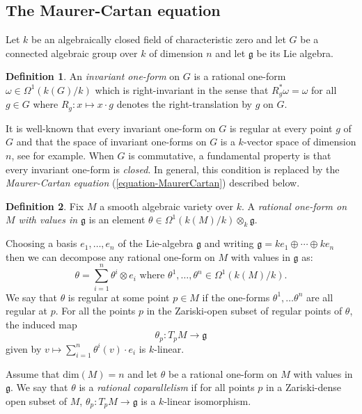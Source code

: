 \documentclass[12pt]{amsart}
\theoremstyle{definition}
\newtheorem{defn}{Definition}[section]
\theoremstyle{plain}
\theoremstyle{exampstyle}\newtheorem{thmx}{Theorem}
\theoremstyle{exampstyle}\newtheorem{thmxbis}{Theorem}
\begin{document}
\subsection{The Maurer-Cartan equation} Let $k$ be an algebraically closed field of characteristic zero and let $G$ be a connected algebraic group over $k$ of dimension $n$ and let $\mathfrak{g}$ be its Lie algebra.

\begin{defn} 
An {\em invariant one-form} on $G$ is a rational one-form $\omega \in \Omega^1(k(G)/k)$ which is right-invariant in the sense that $R_g^\ast \omega = \omega$ for all $g \in G$ where $R_g : x \mapsto x \cdot g$ denotes the right-translation by $g$ on $G$.
\end{defn} 
It is well-known that every invariant one-form on $G$ is regular at every point $g$ of $G$ and that the space of invariant one-forms on $G$ is a $k$-vector space of dimension $n$, see \cite{Kolchin-abelian} for example. When $G$ is commutative, a fundamental property is that every invariant one-form is {\em closed}. In general, this condition is replaced by the {\em Maurer-Cartan equation} (\ref{equation-MaurerCartan}) described below.


\begin{defn}
Fix $M$ a smooth algebraic variety over $k$. A {\em rational one-form on $M$ with values in $\mathfrak{g}$} is an element $\theta \in \Omega^1(k(M)/k) \otimes_k \mathfrak{g}$. 
\end{defn} 

Choosing a basis $e_1,\ldots, e_n$ of the Lie-algebra $\mathfrak{g}$ and writing $\mathfrak{g} = ke_1 \oplus \cdots \oplus ke_n$ then we can decompose any rational one-form on $M$ with values in $\mathfrak{g}$ as:
$$\theta = \sum_{i = 1}^n \theta^i \otimes e_i \text{ where } \theta^1,\ldots,\theta^n \in \Omega^1(k(M)/k).$$
We say that $\theta$ is regular at some point $p \in M$ if the one-forms $\theta^1,\ldots \theta^n$ are all regular at $p$. For all the points $p$ in the Zariski-open subset of regular points of $\theta$, the induced map
$$\theta_p : T_p M \rightarrow \mathfrak{g}$$ 
given by $v \mapsto \sum_{i = 1}^n \theta^i(v) \cdot e_i$ is $k$-linear. 

{ Assume that $\mathrm{dim}(M) = n$ and let $\theta$ be a rational one-form on $M$ with values in $\mathfrak{g}$. We say that $\theta$ is a {\em rational coparallelism} if for all points $p$ in a Zariski-dense open subset of $M$, $\theta_p: T_p M \rightarrow \mathfrak{g}$ is a $k$-linear isomorphism.}
\end{document}
